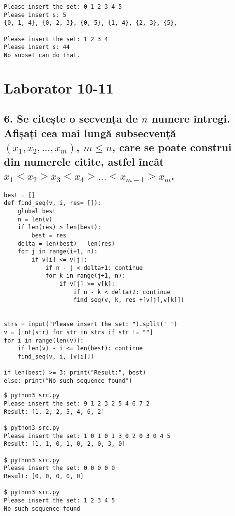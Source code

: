 \documentclass[11pt]{article}
\begin{document}
\begin{itemize}
\begin{itemize}
\begin{verbatim}
Please insert the set: 0 1 2 3 4 5
Please insert s: 5
{0, 1, 4}, {0, 2, 3}, {0, 5}, {1, 4}, {2, 3}, {5}, 

Please insert the set: 1 2 3 4
Please insert s: 44
No subset can do that.
\end{verbatim}

\pagebreak



\section*{Laborator 10-11}
\label{sec:orgedc6649}
\subsection*{6. Se citește o secvența de \(n\) numere întregi. Afișați cea mai lungă subsecvență \((x_1, x_2,..., x_m)\), \(m \le n\), care se poate construi din numerele citite, astfel încât \(x_1 \le x_2 \ge x_3 \le x_4 \ge ... \le x_{m-1} \ge x_m\).}
\label{sec:org61197de}
\begin{verbatim}
best = []
def find_seq(v, i, res= []):
    global best
    n = len(v)
    if len(res) > len(best):
        best = res
    delta = len(best) - len(res)
    for j in range(i+1, n):
        if v[i] <= v[j]:
            if n - j < delta+1: continue
            for k in range(j+1, n):
                if v[j] >= v[k]:
                    if n - k < delta+2: continue
                    find_seq(v, k, res +[v[j],v[k]])


strs = input("Please insert the set: ").split(' ')
v = [int(str) for str in strs if str != ""]
for i in range(len(v)):
    if len(v) - i <= len(best): continue
    find_seq(v, i, [v[i]])

if len(best) >= 3: print("Result:", best)
else: print("No such sequence found")
\end{verbatim}
\begin{verbatim}
$ python3 src.py
Please insert the set: 9 1 2 3 2 5 4 6 7 2
Result: [1, 2, 2, 5, 4, 6, 2]

$ python3 src.py
Please insert the set: 1 0 1 0 1 3 0 2 0 3 0 4 5
Result: [1, 1, 0, 1, 0, 2, 0, 3, 0]

$ python3 src.py
Please insert the set: 0 0 0 0 0
Result: [0, 0, 0, 0, 0]

$ python3 src.py
Please insert the set: 1 2 3 4 5
No such sequence found
\end{verbatim}


\end{itemize}
\end{itemize}
\end{document}
